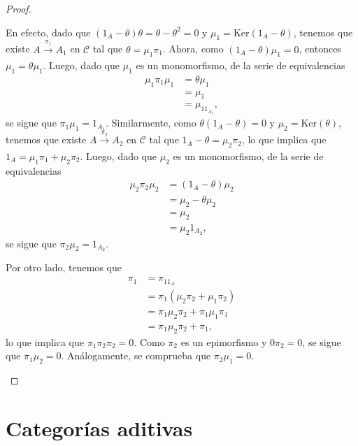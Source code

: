 \documentclass[tesis]{subfiles}
\begin{document}
\begin{proof}
\begin{enumerate}[label=(\alph*)]
            En efecto, dado que $(1_A-\theta)\theta = \theta - \theta^2 = 0$ y $\mu_1 = \text{Ker}(1_A-\theta)$, tenemos que existe $A\xrightarrow[]{\pi_1}A_1$ en $\mathscr{C}$ tal que $\theta=\mu_1\pi_1$. Ahora, como $(1_A-\theta)\mu_1=0$, entonces $\mu_1 = \theta\mu_1$. Luego, dado que $\mu_1$ es un monomorfismo, de la serie de equivalencias
            \begin{align*}
                \mu_1\pi_1\mu_1 &= \theta\mu_1 \\
                                &= \mu_1 \\
                                &= \mu_11_{A_1},
            \end{align*}
            se sigue que $\pi_1\mu_1 = 1_{A_1}$. Similarmente, como $\theta(1_A-\theta)=0$ y $\mu_2=\text{Ker}(\theta)$, tenemos que existe $A\xrightarrow[]{\pi_2}A_2$ en $\mathscr{C}$ tal que $1_A-\theta = \mu_2\pi_2$, lo que implica que $1_A = \mu_1\pi_1 + \mu_2\pi_2$. Luego, dado que $\mu_2$ es un monomorfismo, de la serie de equivalencias
            \begin{align*}
                \mu_2\pi_2\mu_2 &= (1_A-\theta)\mu_2 \\
                                &= \mu_2 - \theta\mu_2 \\
                                &= \mu_2 \\
                                &= \mu_2 1_{A_2},
            \end{align*}
            se sigue que $\pi_2\mu_2 = 1_{A_2}$. 

            Por otro lado, tenemos que
            \begin{align*}
                \pi_1 &= \pi_11_A \\
                      &= \pi_1(\mu_2\pi_2 + \mu_1\pi_2) \\
                      &= \pi_1\mu_2\pi_2 + \pi_1\mu_1\pi_1 \\
                      &= \pi_1\mu_2\pi_2 + \pi_1,
            \end{align*}
            lo que implica que $\pi_1\pi_2\pi_2=0$. Como $\pi_2$ es un epimorfismo y $0\pi_2=0$, se sigue que $\pi_1\mu_2=0$. Análogamente, se comprueba que $\pi_2\mu_1=0$.
    \end{enumerate}
\end{proof}

\section{Categorías aditivas} \label{Sec: Categorías aditivas}
\end{document}

